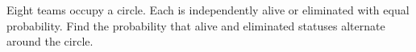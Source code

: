 Eight teams occupy a circle. Each is independently alive or eliminated with equal probability. Find the probability that alive and eliminated statuses alternate around the circle.
